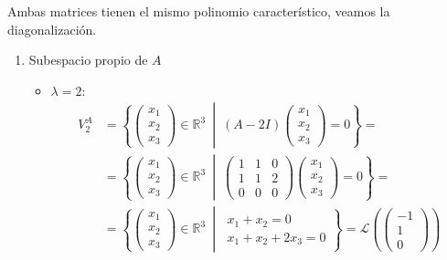 \documentclass[12pt]{article}
\begin{document}
\begin{ejercicio}[2 puntos]
	Ambas matrices tienen el mismo polinomio característico, veamos la diagonalización.
	\begin{enumerate}
		\item Subespacio propio de \( A \)
		\begin{itemize}
			\item \( \lambda = 2 \):
			\begin{align*}
				V_2^A &= \left\{
				\begin{pmatrix}
					x_1 \\
					x_2 \\
					x_3
				\end{pmatrix}
				\in \mathbb{R}^3 \ \middle| \ 
				(A - 2I)
				\begin{pmatrix}
					x_1 \\
					x_2 \\
					x_3
				\end{pmatrix}
				= 0
				\right\}
				=\\&= \left\{
				\begin{pmatrix}
					x_1 \\
					x_2 \\
					x_3
				\end{pmatrix}
				\in \mathbb{R}^3 \ \middle| \
				\begin{pmatrix}
					1 & 1 & 0 \\
					1 & 1 & 2 \\
					0 & 0 & 0
				\end{pmatrix}
				\begin{pmatrix}
					x_1 \\
					x_2 \\
					x_3
				\end{pmatrix}
				= 0
				\right\}
				=\\&= \left\{
				\begin{pmatrix}
					x_1 \\
					x_2 \\
					x_3
				\end{pmatrix}
				\in \mathbb{R}^3 \ \middle| \
				\begin{array}{l}
					x_1 + x_2 = 0 \\
					x_1 + x_2 + 2x_3 = 0
				\end{array}
				\right\}
				= \mathcal{L} \left( \begin{pmatrix} -1 \\ 1 \\ 0 \end{pmatrix} \right)
			\end{align*}
			

\end{itemize}
\end{enumerate}
\end{ejercicio}
\end{document}
